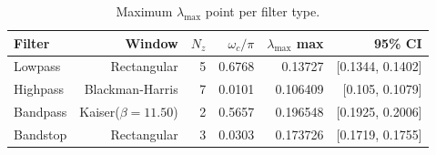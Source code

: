 \begin{table}[htbp]
  \centering
  \caption{Maximum $\lambda_{\max}$ point per filter type.}
  \begin{tabular}{lrrrrr}
    \toprule
    Filter & Window & $N_z$ & $\omega_c/\pi$ & $\lambda_{\max}$ max & 95\% CI \\
    \midrule
    Lowpass & Rectangular & 5 & 0.6768 & 0.13727 & [0.1344, 0.1402] \\
    Highpass & Blackman-Harris & 7 & 0.0101 & 0.106409 & [0.105, 0.1079] \\
    Bandpass & Kaiser($\beta=11.50$) & 2 & 0.5657 & 0.196548 & [0.1925, 0.2006] \\
    Bandstop & Rectangular & 3 & 0.0303 & 0.173726 & [0.1719, 0.1755] \\
    \bottomrule
  \end{tabular}
\end{table}
